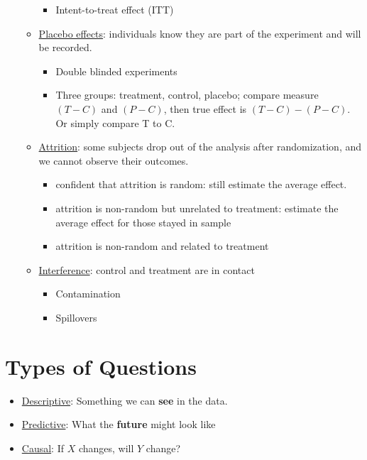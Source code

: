 \documentclass[10pt, letterpaper]{article}
\begin{document}
\begin{multicols}{2}
\begin{itemize}
\begin{itemize}
		\begin{itemize}
			\item Intent-to-treat effect (ITT)
		\end{itemize}
		\item \underline{Placebo effects}: individuals know they are part of the experiment and will be recorded.
		\begin{itemize}
			\item Double blinded experiments
			\item Three groups: treatment, control, placebo; compare measure $(T-C)$ and $(P-C)$, then true effect is $(T-C)-(P-C)$. Or simply compare T to C.
		\end{itemize}
		\item \underline{Attrition}: some subjects drop out of the analysis after randomization, and we cannot observe their outcomes. 
		\begin{itemize}
			\item confident that attrition is random: still estimate the average effect.
			\item attrition is non-random but unrelated to treatment: estimate the average effect for those stayed in sample
			\item attrition is non-random and related to treatment
		\end{itemize}
		\item \underline{Interference}: control and treatment are in contact
		\begin{itemize}
			\item Contamination
			\item Spillovers
		\end{itemize}
	\end{itemize}
\end{itemize}
\thispagestyle{plain}
\end{multicols}



\maketitle\thispagestyle{fancy}
\section{Types of Questions}
\begin{itemize}
	\item \underline{Descriptive}: Something we can \textbf{see} in the data.
	\item \underline{Predictive}: What the \textbf{future} might look like
	\item \underline{Causal}: If $X$ changes, will $Y$ change? 
\end{itemize}
\end{document}
